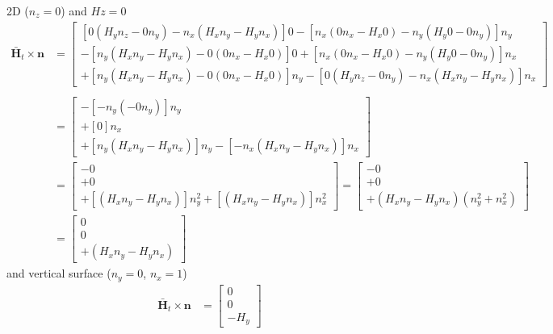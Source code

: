 \documentclass{article}
\newcommand{\Hb}{\mathbf{\bar H}}
\newcommand{\n}{\mathbf{n}}
\newcommand{\0}{\varnothing}
\begin{document}
2D ($n_z = 0$) and $Hz = 0$ 
\begin{align*}
    \Hb_t \times \n &=  \left[
    \begin{array}{c}
    [0 (H_y n_z - 0 n_y) - n_x (H_x n_y - H_y n_x)] 0 - [n_x (0 n_x - H_x 0) - n_y (H_y 0 - 0 n_y)] n_y\\
    -[n_y (H_x n_y - H_y n_x) - 0 (0 n_x - H_x 0)] 0 + [n_x (0 n_x - H_x 0) - n_y (H_y 0 - 0 n_y)]n_x\\
    +[n_y (H_x n_y - H_y n_x) - 0 (0 n_x - H_x 0)] n_y - [0 (H_y n_z - 0 n_y) - n_x (H_x n_y - H_y n_x)]n_x
    \end{array} \right]\\\\
    &=  \left[
    \begin{array}{c}
     - [ - n_y ( - 0 n_y)] n_y\\
     + [0] n_x\\
    +[n_y (H_x n_y - H_y n_x)] n_y - [ - n_x (H_x n_y - H_y n_x)]n_x
    \end{array} \right]\\    
    &=  \left[
    \begin{array}{c}
     - 0\\
     + 0\\
    +[(H_x n_y - H_y n_x)] n^2_y + [(H_x n_y - H_y n_x)]n^2_x
    \end{array} \right] = \left[
    \begin{array}{c}
     - 0\\
     + 0\\
    +(H_x n_y - H_y n_x)(n^2_y+ n^2_x)
    \end{array} \right]\\
    &=  \left[
    \begin{array}{c}
     0\\
     0\\
    +(H_x n_y - H_y n_x)
    \end{array} \right]
\end{align*}
and vertical surface ($n_y = 0$, $n_x = 1$)
\begin{align*}
	\Hb_t \times \n &=  \left[
	\begin{array}{c}
     0\\
     0\\
    - H_y
    \end{array} \right]
\end{align*}
\end{document}
